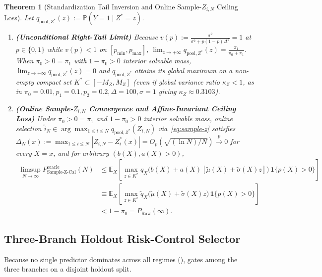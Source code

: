 \documentclass{article}
\theoremstyle{plain}
\newtheorem{theorem}{Theorem}
\theoremstyle{definition}
\theoremstyle{remark}
\newcommand{\E}{\mathbb{E}}
\newcommand{\Prob}{\mathbb{P}}
\newcommand{\ind}{\mathbf{1}}
\begin{document}
\begin{theorem}[Standardization Tail Inversion and Online Sample-$Z_{i,N}$ Ceiling Loss]
\label{thm:sample-z-ceiling}
Let $q_{\mathrm{pool}, Z^*}(z) := \Prob(Y = 1 \mid Z^* = z)$.
\begin{enumerate}[leftmargin=1.6em,itemsep=2pt,topsep=1pt]
    \item \textbf{(Unconditional Right-Tail Limit)} Because $v(p) := \frac{\sigma^2}{\sigma^2 + p(1-p)\Delta^2} = 1$ at $p \in \{0, 1\}$ while $v(p) < 1$ on $[p_{\min}, p_{\max}]$, $\lim_{z \to +\infty} q_{\mathrm{pool}, Z^*}(z) = \frac{\pi_1}{\pi_0 + \pi_1}$. When $\pi_0 > 0 = \pi_1$ with $1-\pi_0 > 0$ interior solvable mass, $\lim_{z\to+\infty} q_{\mathrm{pool}, Z^*}(z) = 0$ and $q_{\mathrm{pool}, Z^*}$ attains its global maximum on a non-empty compact set $K^* \subset [-M_Z, M_Z]$ (even if global variance ratio $\kappa_Z < 1$, as in $\pi_0=0.01, p_1=0.1, p_2=0.2, \Delta=100, \sigma=1$ giving $\kappa_Z \approx 0.3103$).
    \item \textbf{(Online Sample-$Z_{i,N}$ Convergence and Affine-Invariant Ceiling Loss)} Under $\pi_0 > 0 = \pi_1$ and $1 - \pi_0 > 0$ interior solvable mass, online selection $\hat{i}_N \in \arg\max_{1\le i\le N} q_{\mathrm{pool}, Z^*}(Z_{i,N})$ via~\eqref{eq:sample-z} satisfies $\Delta_N(x) := \max_{1 \le i \le N} |Z_{i,N} - Z_i^*(x)| = O_p(\sqrt{(\ln N)/N}) \xrightarrow{p} 0$ for every $X = x$, and for arbitrary $(b(X), a(X) > 0)$,
    \begin{align}
    \limsup_{N \to \infty} P_{\mathrm{Sample\text{-}Z\text{-}Cal}}^{\mathrm{oracle}}(N)
    &\le \E_X\!\left[\max_{z \in K^*} q_X\!\big(b(X) + a(X)[\tilde{\mu}(X) + \tilde{\sigma}(X)z]\big)\,\ind\{p(X) > 0\}\right] \nonumber\\
    &\equiv \E_X\!\left[\max_{z \in K^*} \tilde{q}_X\!\big(\tilde{\mu}(X) + \tilde{\sigma}(X)z\big)\,\ind\{p(X) > 0\}\right] \nonumber\\
    &< 1 - \pi_0 = P_{\mathrm{Raw}}(\infty).
    \end{align}
\end{enumerate}
\end{theorem}

\subsection{Three-Branch Holdout Risk-Control Selector}

Because no single predictor dominates across all regimes (),  gates among the three branches on a disjoint holdout split.
\end{document}
